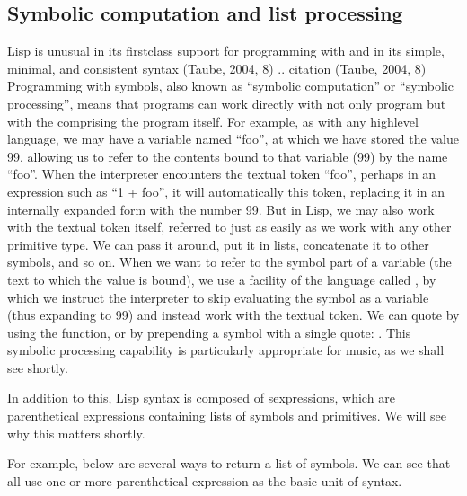 \documentclass[letterpaper,10pt,english]{sphinxmanual}
\begin{document}
\subsection{Symbolic computation and list processing}
\label{\detokenize{design:symbolic-computation-and-list-processing}}
\sphinxAtStartPar
Lisp is unusual in its first\sphinxhyphen{}class support for programming with  and in its simple, minimal, and consistent syntax (Taube, 2004, 8)
.. citation (Taube, 2004, 8)
Programming with symbols, also known as “symbolic computation” or “symbolic processing”, means
that programs can work directly with not only program  but with the  comprising the program itself.
For example, as with any high\sphinxhyphen{}level language, we may have a variable named “foo”, at which we have stored the value 99,
allowing us to refer to the contents bound to that variable (99) by the name “foo”.
When the interpreter encounters the textual token “foo”, perhaps in an expression such as “1 + foo”,
it will automatically  this token, replacing it in an internally expanded form with the number 99.
But in Lisp, we may also work with the textual token itself, referred to 
just as easily as we work with any other primitive type. We can pass it around, put it in lists,
concatenate it to other symbols, and so on.
When we want to refer to the symbol part of a variable (the text to which the value is bound),
we use a facility of the language called , by which we instruct the interpreter
to skip evaluating the symbol as a variable (thus expanding to 99) and instead work with the textual token.
We can quote by using the  function, or by prepending a symbol with a single quote: .
This symbolic processing capability is particularly appropriate for music, as we shall see shortly.

\sphinxAtStartPar
In addition to this, Lisp syntax is  composed of s\sphinxhyphen{}expressions, which are parenthetical
expressions containing lists of symbols and primitives. We will see why this matters shortly.

\sphinxAtStartPar
For example, below are several ways to return a list of symbols. We can see that all
use one or more parenthetical expression as the basic unit of syntax.
\end{document}
